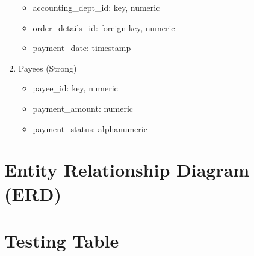 \documentclass{article}
\let\oldsection\section
\renewcommand\section{\clearpage\oldsection}
\begin{document}
\begin{enumerate}
\begin{itemize}
        \item accounting\_dept\_id: key, numeric
        \item order\_details\_id: foreign key, numeric
        \item payment\_date: timestamp
    \end{itemize}
\item Payees (Strong)
    \begin{itemize}
        \item payee\_id: key, numeric
        \item payment\_amount: numeric
        \item payment\_status: alphanumeric
    \end{itemize}
\end{enumerate}


\section{Entity Relationship Diagram (ERD)}
\begin{figure}

\end{figure}

\section{Testing Table}
\end{document}
